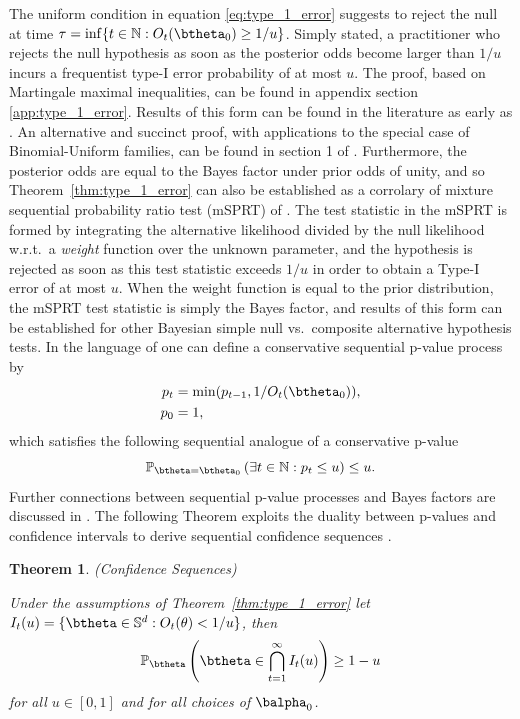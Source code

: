 \documentclass[11pt]{article}
\newtheorem{thm}{Theorem}[section]
\begin{document}
The uniform condition in equation \ref{eq:type_1_error} suggests to reject the null at time $\tau = \inf \lbrace t \in \mathbb{N}: O_t(\btheta_0) \geq 1/u \rbrace$.
Simply stated, a practitioner who rejects the null hypothesis as soon as the posterior odds become larger than $1/u$ incurs a frequentist type-I error probability of at most $u$.
The proof, based on Martingale maximal inequalities, can be found in appendix section \ref{app:type_1_error}.
Results of this form can be found in the literature as early as \cite{ville}.
An alternative and succinct proof, with applications to the special case of Binomial-Uniform families, can be found in section 1 of \cite{robbins}.
Furthermore, the posterior odds are equal to the Bayes factor under prior odds of unity, and so Theorem~\ref{thm:type_1_error} can also be established as a corrolary of mixture sequential probability ratio test (mSPRT) of \cite{wald}.
The test statistic in the mSPRT is formed by integrating the alternative likelihood divided by the null likelihood w.r.t.\ a \textit{weight} function over the unknown parameter, and the hypothesis is rejected as soon as this test statistic exceeds $1/u$ in order to obtain a Type-I error of at most $u$.
When the weight function is equal to the prior distribution, the mSPRT test statistic is simply the Bayes factor, and results of this form can be established for other Bayesian simple null vs.\ composite alternative hypothesis tests.
In the language of \cite{johari} one can define a conservative sequential p-value process by
\begin{align*}
  p_t &= \min(p_{t-1}, 1/O_t(\btheta_0)),\\
  p_0 &=1,
\end{align*}
which satisfies the following sequential analogue of a conservative p-value
\begin{equation}
  \label{eq:conservative_p_value}
  \mathbb{P}_{\btheta = \btheta_0}\left( \exists t \in \mathbb{N}: p_t \leq u \right) \leq u.
\end{equation}
Further connections between sequential p-value processes and Bayes factors are discussed in \cite{shafer}.
The following Theorem exploits the duality between p-values and confidence intervals to derive sequential confidence sequences .
\begin{thm}(Confidence Sequences)
  
  \label{thm:confidence_sequence}
  \noindent Under the assumptions of Theorem~\ref{thm:type_1_error} let $I_t(u) = \lbrace \btheta \in \mathbb{S}^d : O_t(\theta) < 1/u  \rbrace$, then
\begin{equation}
  \label{eq:confidence_sequence}
  \mathbb{P}_{\btheta}\left( \btheta \in \bigcap_{t=1}^{\infty} I_t(u) \right) \geq 1- u
\end{equation}
for all $u \in [0,1]$ and for all choices of $\balpha_0$.

\end{thm}
\end{document}

